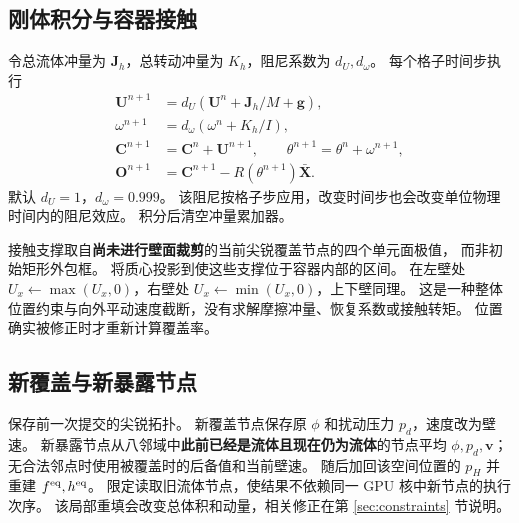
\subsection{刚体积分与容器接触}
令总流体冲量为 $\bm J_h$，总转动冲量为 $K_h$，阻尼系数为 $d_U,d_\omega$。
每个格子时间步执行
\begin{align}
 \bm U^{n+1}&=d_U(\bm U^n+\bm J_h/M+\bm g),\\
 \omega^{n+1}&=d_\omega(\omega^n+K_h/I),\\
 \bm C^{n+1}&=\bm C^n+\bm U^{n+1},\qquad
 \theta^{n+1}=\theta^n+\omega^{n+1},\\
 \bm O^{n+1}&=\bm C^{n+1}-R(\theta^{n+1})\bar{\bm X}.
\end{align}
默认 $d_U=1$，$d_\omega=0.999$。
该阻尼按格子步应用，改变时间步也会改变单位物理时间内的阻尼效应。
积分后清空冲量累加器。

接触支撑取自\textbf{尚未进行壁面裁剪}的当前尖锐覆盖节点的四个单元面极值，
而非初始矩形外包框。
将质心投影到使这些支撑位于容器内部的区间。
在左壁处 $U_x\leftarrow\max(U_x,0)$，右壁处
$U_x\leftarrow\min(U_x,0)$，上下壁同理。
这是一种整体位置约束与向外平动速度截断，没有求解摩擦冲量、恢复系数或接触转矩。
位置确实被修正时才重新计算覆盖率。

\subsection{新覆盖与新暴露节点}
 保存前一次提交的尖锐拓扑。
新覆盖节点保存原 $\phi$ 和扰动压力 $p_d$，速度改为壁速。
新暴露节点从八邻域中\textbf{此前已经是流体且现在仍为流体}的节点平均
$\phi,p_d,\bm v$；无合法邻点时使用被覆盖时的后备值和当前壁速。
随后加回该空间位置的 $p_H$ 并重建 $f^{\rm eq},h^{\rm eq}$。
限定读取旧流体节点，使结果不依赖同一 GPU 核中新节点的执行次序。
该局部重填会改变总体积和动量，相关修正在第 \ref{sec:constraints} 节说明。


